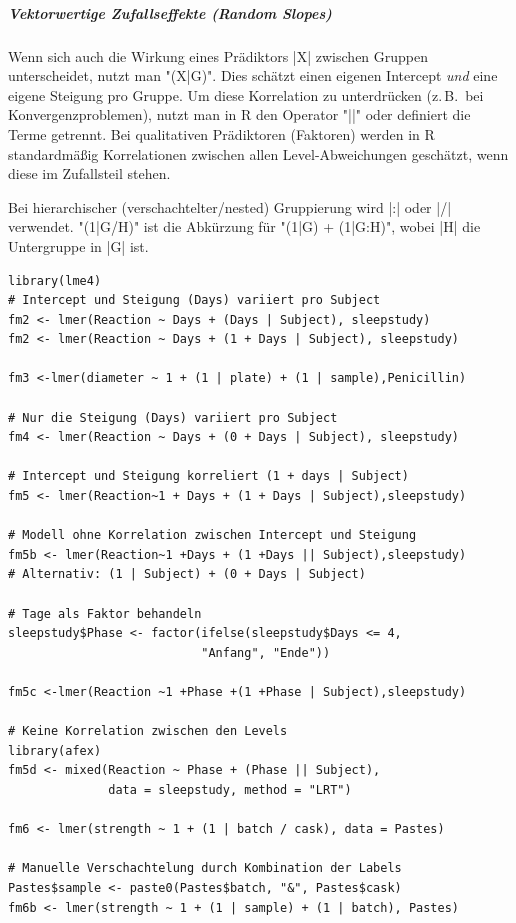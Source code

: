 \documentclass[10pt,twocolumn]{scrartcl}
\renewcommand{\lstinline}{\mycoloredinline}
\begin{document}
\subparagraph{Vektorwertige Zufallseffekte (Random Slopes)}
Wenn sich auch die Wirkung eines Prädiktors \lstinline|X| zwischen Gruppen unterscheidet, nutzt man \lstinline"(X|G)". Dies schätzt einen eigenen Intercept \emph{und} eine eigene Steigung pro Gruppe. Um diese Korrelation zu unterdrücken (z.\,B.\ bei Konvergenzproblemen), nutzt man in R den Operator \lstinline"||" oder definiert die Terme getrennt. Bei qualitativen Prädiktoren (Faktoren) werden in R standardmäßig Korrelationen zwischen allen Level-Abweichungen geschätzt, wenn diese im Zufallsteil stehen.

Bei hierarchischer (verschachtelter/nested) Gruppierung wird \lstinline|:| oder \lstinline|/| verwendet. \lstinline"(1|G/H)" ist die Abkürzung für \lstinline"(1|G) + (1|G:H)", wobei \lstinline|H| die Untergruppe in \lstinline|G| ist.

\begin{lstlisting}
library(lme4)
# Intercept und Steigung (Days) variiert pro Subject
fm2 <- lmer(Reaction ~ Days + (Days | Subject), sleepstudy)
fm2 <- lmer(Reaction ~ Days + (1 + Days | Subject), sleepstudy)

fm3 <-lmer(diameter ~ 1 + (1 | plate) + (1 | sample),Penicillin)

# Nur die Steigung (Days) variiert pro Subject
fm4 <- lmer(Reaction ~ Days + (0 + Days | Subject), sleepstudy)

# Intercept und Steigung korreliert (1 + days | Subject)
fm5 <- lmer(Reaction~1 + Days + (1 + Days | Subject),sleepstudy)

# Modell ohne Korrelation zwischen Intercept und Steigung
fm5b <- lmer(Reaction~1 +Days + (1 +Days || Subject),sleepstudy)
# Alternativ: (1 | Subject) + (0 + Days | Subject)

# Tage als Faktor behandeln
sleepstudy$Phase <- factor(ifelse(sleepstudy$Days <= 4,
                           "Anfang", "Ende"))

fm5c <-lmer(Reaction ~1 +Phase +(1 +Phase | Subject),sleepstudy)

# Keine Korrelation zwischen den Levels
library(afex)
fm5d <- mixed(Reaction ~ Phase + (Phase || Subject),
              data = sleepstudy, method = "LRT")

fm6 <- lmer(strength ~ 1 + (1 | batch / cask), data = Pastes)

# Manuelle Verschachtelung durch Kombination der Labels
Pastes$sample <- paste0(Pastes$batch, "&", Pastes$cask)
fm6b <- lmer(strength ~ 1 + (1 | sample) + (1 | batch), Pastes)
\end{lstlisting}
\end{document}
